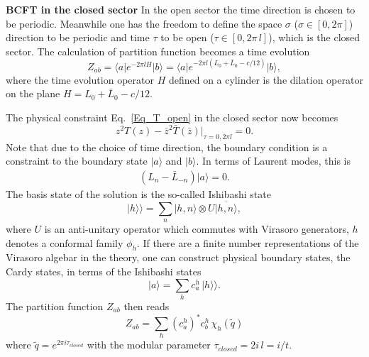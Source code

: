 \documentclass[submission, PhysLectNotes]{SciPost}
\begin{document}
{\bf BCFT in the closed sector}
In the open sector the time direction is chosen to be periodic. Meanwhile one has the freedom to define the space $\sigma$ ($\sigma \in [0,2\pi]$) direction to be periodic and time $\tau$ to be open ($\tau \in [0,2\pi\,l]$), which is the closed sector. The calculation of partition function becomes a time evolution
\begin{equation}
    Z_{ab} = \langle a \vert e^{-2\pi l H} \vert b \rangle = \langle a \vert e^{-2\pi l (L_0 + \bar{L}_0 -c/12)} \vert b \rangle,
\end{equation}
where the time evolution operator $H$ defined on a cylinder is the dilation operator on the plane $H = L_0 + \bar{L}_0 - c/12$. 

The physical constraint Eq.~\ref{Eq_T_open} in the closed sector now becomes 
\begin{equation}
    z^2 T(z) - \bar{z}^2 \bar{T}(\bar{z})\vert_{\tau=0,2\pi l} = 0.
\end{equation}
Note that due to the choice of time direction, the boundary condition is a constraint to the boundary state $\vert a \rangle$ and $\vert b\rangle$. In terms of Laurent modes, this is
\begin{equation}
    \begin{split}
        \left(L_n - \bar{L}_{-n}\right) \vert a \rangle = 0.  
    \end{split}
\end{equation}
The basis state of the solution is the so-called Ishibashi state
\begin{equation}
    \vert h \rangle\rangle = \sum_n \vert h,n\rangle \otimes U\overline{\vert h,n\rangle},
\end{equation}
where $U$ is an anti-unitary operator which commutes with Virasoro generators, $h$ denotes a conformal family $\phi_h$. If there are a finite number representations of the Virasoro algebar in the theory, one can construct physical boundary states, the Cardy states, in terms of the Ishibashi states
\begin{equation}
    \vert a \rangle = \sum_h c_a^h\, \vert h \rangle \rangle. 
\end{equation}
The partition function $Z_{ab}$ then reads
\begin{equation}
    Z_{ab} = \sum_h \left(c_a^h\right)^* c_b^h\, \chi_h(\tilde{q})
\end{equation}
where $\tilde{q} = e^{2\pi i \tau_{closed}}$ with the modular parameter $\tau_{closed} = 2i\,l = i/t$.
\end{document}

